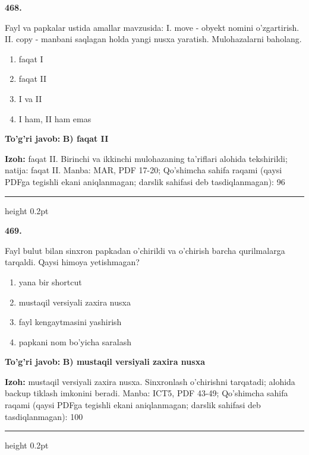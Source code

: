 \documentclass[10pt,a4paper]{article}
\begin{document}
{\bfseries\sffamily\color{ink} 468.}
\par
Fayl va papkalar ustida amallar mavzusida: I. move - obyekt nomini o'zgartirish. II. copy - manbani saqlagan holda yangi nusxa yaratish. Mulohazalarni baholang.
\begin{enumerate}[label=\Alph*),leftmargin=9mm]
\item faqat I
\item faqat II
\item I va II
\item I ham, II ham emas
\end{enumerate}
\begin{tcolorbox}[enhanced,breakable,colback=teal!4,colframe=teal!60!black,boxrule=0.45pt,arc=1.2mm,left=2.7mm,right=2.7mm,top=1.8mm,bottom=1.8mm,before skip=2mm,after skip=2mm]
{\bfseries\sffamily\color{teal}To'g'ri javob:} \textbf{B) faqat II}
\par\smallskip
{\bfseries Izoh:} faqat II. Birinchi va ikkinchi mulohazaning ta'riflari alohida tekshirildi; natija: faqat II. Manba: MAR, PDF 17-20; Qo'shimcha sahifa raqami (qaysi PDFga tegishli ekani aniqlanmagan; darslik sahifasi deb tasdiqlanmagan): 96
\end{tcolorbox}
\vspace{2mm}\hrule height 0.2pt\vspace{3mm}

{\bfseries\sffamily\color{ink} 469.}
\par
Fayl bulut bilan sinxron papkadan o'chirildi va o'chirish barcha qurilmalarga tarqaldi. Qaysi himoya yetishmagan?
\begin{enumerate}[label=\Alph*),leftmargin=9mm]
\item yana bir shortcut
\item mustaqil versiyali zaxira nusxa
\item fayl kengaytmasini yashirish
\item papkani nom bo'yicha saralash
\end{enumerate}
\begin{tcolorbox}[enhanced,breakable,colback=teal!4,colframe=teal!60!black,boxrule=0.45pt,arc=1.2mm,left=2.7mm,right=2.7mm,top=1.8mm,bottom=1.8mm,before skip=2mm,after skip=2mm]
{\bfseries\sffamily\color{teal}To'g'ri javob:} \textbf{B) mustaqil versiyali zaxira nusxa}
\par\smallskip
{\bfseries Izoh:} mustaqil versiyali zaxira nusxa. Sinxronlash o'chirishni tarqatadi; alohida backup tiklash imkonini beradi. Manba: ICT5, PDF 43-49; Qo'shimcha sahifa raqami (qaysi PDFga tegishli ekani aniqlanmagan; darslik sahifasi deb tasdiqlanmagan): 100
\end{tcolorbox}
\vspace{2mm}\hrule height 0.2pt\vspace{3mm}
\end{document}
